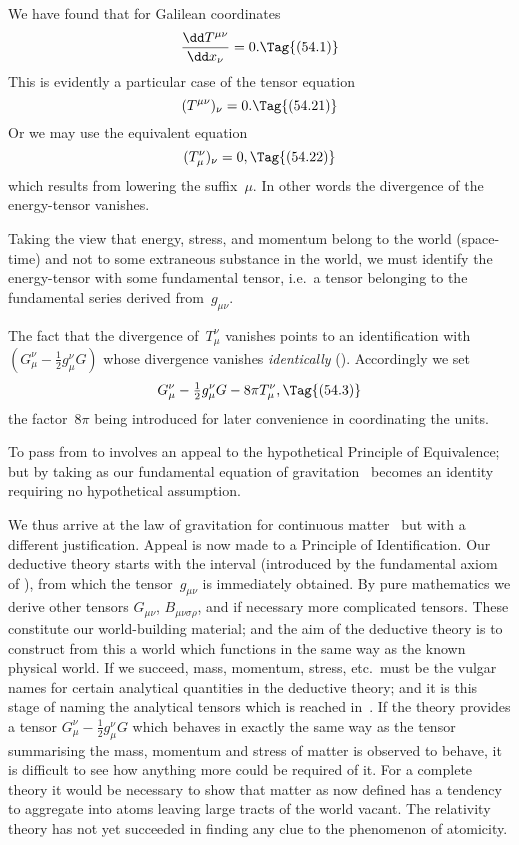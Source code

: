 \documentclass[12pt]{book}
\begin{document}
%
%

We have found that for Galilean coordinates
\[
\frac{\dd T^{\mu\nu}}{\dd x_{\nu}} = 0.
\Tag{(54.1)}
\]
This is evidently a particular case of the tensor equation
\[
(T^{\mu\nu})_{\nu} = 0.
\Tag{(54.21)}
\]
Or we may use the equivalent equation
\[
(T_{\mu}^{\nu})_{\nu} = 0,
\Tag{(54.22)}
\]
which results from lowering the suffix~$\mu$. In other words the divergence of
%
the energy\hyp{}tensor vanishes.

Taking the view that energy, stress, and momentum belong to the world
(space-time) and not to some extraneous substance in the world, we must
identify the energy\hyp{}tensor with some fundamental tensor, i.e.\ a tensor belonging
to the fundamental series derived from~$g_{\mu\nu}$.

The fact that the divergence of~$T_{\mu}^{\nu}$ vanishes points to an identification
with $(G_{\mu}^{\nu} - \frac{1}{2}g_{\mu}^{\nu} G)$ whose divergence vanishes \emph{identically} (). Accordingly
we set
\[
G_{\mu}^{\nu} - \tfrac{1}{2}g_{\mu}^{\nu} G - 8\pi T_{\mu}^{\nu},
\Tag{(54.3)}
\]
the factor~$8\pi$ being introduced for later convenience in coordinating the units.

To pass from  to  involves an appeal to the hypothetical
Principle of Equivalence; but by taking  as our fundamental equation
%
%
of gravitation ~becomes an identity requiring no hypothetical assumption.

We thus arrive at the law of gravitation for continuous matter~
%
but with a different justification. Appeal is now made to a Principle of
Identification. Our deductive theory starts with the interval (introduced by
the fundamental axiom of ), from which the tensor~$g_{\mu\nu}$ is immediately
obtained. By pure mathematics we derive other tensors $G_{\mu\nu}$, $B_{\mu\nu\sigma\rho}$, and if
necessary more complicated tensors. These constitute our world\hyp{}building
material; and the aim of the deductive theory is to construct from this a
world which functions in the same way as the known physical world. If we
succeed, mass, momentum, stress, etc.\ must be the vulgar names for certain
analytical quantities in the deductive theory; and it is this stage of naming
the analytical tensors which is reached in~. If the theory provides a
tensor $G_{\mu}^{\nu} - \frac{1}{2} g_{\mu}^{\nu} G$ which behaves in exactly the same way as the tensor
summarising the mass, momentum and stress of matter is observed to behave,
it is difficult to see how anything more could be required of it\footnotemark.\footnotetext
  {For a complete theory it would be necessary to show that matter as now defined has a
%
  tendency to aggregate into atoms leaving large tracts of the world vacant. The relativity theory
  has not yet succeeded in finding any clue to the phenomenon of atomicity.}
\end{document}
